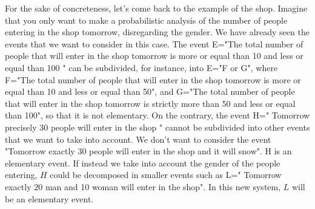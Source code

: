 \documentclass[12pt]{article}
\newcommand{\<}{{\langle \!\! \langle}}
\renewcommand{\>}{{\rangle \!\! \rangle}}
\begin{document}
For the sake of concreteness, let's come back to the example of the shop. Imagine that you only want to make a probabilistic analysis of  the number of people entering in the shop tomorrow, disregarding the gender. We have already seen the events that we want to consider in this case. The event E="The total number of people that will enter in the shop tomorrow is more or equal than 10 and less or equal than 100 " can be subdivided, for instance, into E="F or G", where 
F="The total number of people that will enter in the shop tomorrow is more or equal than 10 and less or equal than 50", and 
G="The total number of people that will enter in the shop tomorrow is strictly more than 50 and less or equal than 100", so that it is not elementary. On the contrary, the event H=" Tomorrow precisely 30 people will enter in the shop " cannot be subdivided into other events that we want to take into account. We don't want to consider the event "Tomorrow exactly 30 people will enter in the shop and it will snow". H is an elementary event. 
If instead we take into account the gender of the people entering, $H$ could be decomposed in smaller events such as L=" Tomorrow exactly 20 man and 10 woman will enter in the shop". In this new system, $L$ will be an elementary event. \\ 
\end{document}
